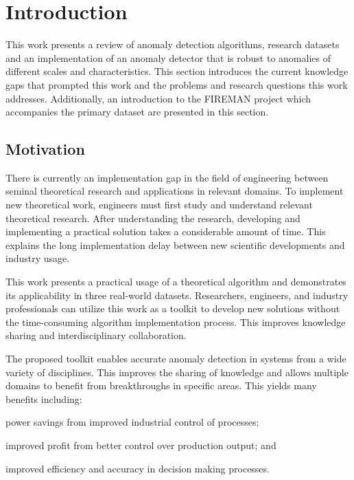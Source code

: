 \section{Introduction}
\label{ref_intro}

This work presents a review of anomaly detection algorithms, research datasets and an implementation of an anomaly detector that is robust to anomalies of different scales and characteristics. This section introduces the current knowledge gaps that prompted this work and the problems and research questions this work addresses. Additionally, an introduction to the FIREMAN project which accompanies the primary dataset are presented in this section.

\subsection{Motivation}

There is currently an implementation gap in the field of engineering between seminal theoretical research and applications in relevant domains. To implement new theoretical work, engineers must first study and understand relevant theoretical research. After understanding the research, developing and implementing a practical solution takes a considerable amount of time. This explains the long implementation delay between new scientific developments and industry usage.

This work presents a practical usage of a theoretical algorithm and demonstrates its applicability in three real-world datasets. Researchers, engineers, and industry professionals can utilize this work as a toolkit to develop new solutions without the time-consuming algorithm implementation process. This improves knowledge sharing and interdisciplinary collaboration.

The proposed toolkit enables accurate anomaly detection in systems from a wide variety of disciplines. This improves the sharing of knowledge and allows multiple domains to benefit from breakthroughs in specific areas. This yields many benefits including:
\begin{inlinelist}
  \item power savings from improved industrial control of processes;
  \item improved profit from better control over production output; and
  \item improved efficiency and accuracy in decision making processes.
\end{inlinelist}

